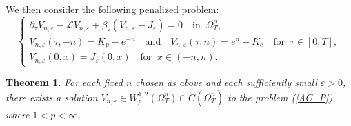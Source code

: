 \documentclass[11pt, a4paper, leqno]{amsart}
\numberwithin{equation}{section}
\theoremstyle{plain}
\newtheorem{theorem}{Theorem}[section]
\theoremstyle{definition}
\theoremstyle{remark}
\begin{document}
We then consider the following penalized problem:
\begin{equation}\label{AC_P}
    \begin{cases}
    \partial_{\tau} V_{n,\varepsilon}-\mathcal{L} V_{n,\varepsilon}
    +\beta_\varepsilon(V_{n,\varepsilon}-J_{\varepsilon})=0
    \quad \text{in }\ \Omega^{n}_T,
    \\
    {
    V_{n,\varepsilon}(\tau,-n)=K_p-e^{-n}
    \quad \text{and} \quad
    V_{n,\varepsilon}(\tau,n)=e^{n}-K_c
    \quad \text{for }\ \tau \in [0,T],
    }
    \\
    V_{n,\varepsilon}(0,x)=J_{\varepsilon}(0,x)
    \quad \text{for }\ x\in (-n,n).
\end{cases}
\end{equation}

\begin{theorem}\label{thm:existenceVnepsilon}
    {
    For each fixed $n$ chosen as above and each sufficiently small
    $\varepsilon>0$,
    }
    there exists a solution
    $V_{n,\varepsilon}\in W^{1,2}_p(\Omega_T^n) \cap
    C(\overline{\Omega_T^n})$ to the problem (\ref{AC_P}),
    where $1<p<\infty.$
\end{theorem}
\end{document}
